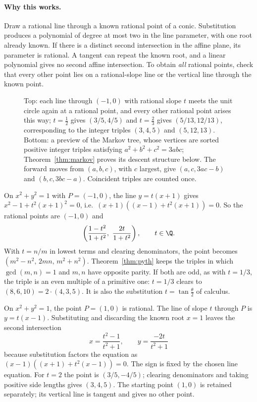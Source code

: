 \paragraph{Why this works.}
Draw a rational line through a known rational point of a conic. Substitution produces a polynomial of degree at most two in the line parameter, with one root already known. If there is a distinct second intersection in the affine plane, its parameter is rational. A tangent can repeat the known root, and a linear polynomial gives no second affine intersection. To obtain \emph{all} rational points, check that every other point lies on a rational-slope line or the vertical line through the known point.

\begin{figure}[ht]
\centering
{}
\caption{Top: each line through $(-1,0)$ with rational slope $t$ meets the unit circle again at a rational point, and every other rational point arises this way; $t=\frac12$ gives $(3/5,4/5)$ and $t=\frac23$ gives $(5/13,12/13)$, corresponding to the integer triples $(3,4,5)$ and $(5,12,13)$. Bottom: a preview of the Markov tree, whose vertices are sorted positive integer triples satisfying $a^2+b^2+c^2=3abc$; Theorem~\ref{thm:markov} proves its descent structure below. The forward moves from $(a,b,c)$, with $c$ largest, give $(a,c,3ac-b)$ and $(b,c,3bc-a)$. Coincident triples are counted once.}
\label{fig:chordmarkov}
\end{figure}

\begin{example}
On $x^2+y^2=1$ with $P=(-1,0)$, the line $y=t(x+1)$ gives $x^2-1+t^2(x+1)^2=0$, i.e.\ $(x+1)\left((x-1)+t^2(x+1)\right)=0$. So the rational points are $(-1,0)$ and
\[
\left(\frac{1-t^2}{1+t^2},\ \frac{2t}{1+t^2}\right),\qquad t\in\Q.
\]
With $t=n/m$ in lowest terms and clearing denominators, the point becomes $(m^2-n^2,\,2mn,\,m^2+n^2)$. Theorem~\ref{thm:pyth} keeps the triples in which $\gcd(m,n)=1$ and $m,n$ have opposite parity. If both are odd, as with $t=1/3$, the triple is an even multiple of a primitive one: $t=1/3$ clears to $(8,6,10)=2\cdot(4,3,5)$. It is also the substitution $t=\tan\frac\theta2$ of calculus.
\end{example}

\begin{examplex}
On $x^2+y^2=1$, the point $P=(1,0)$ is rational. The line of slope $t$ through $P$ is $y=t(x-1)$. Substituting and discarding the known root $x=1$ leaves the second intersection
\[
x=\frac{t^2-1}{t^2+1},\qquad y=\frac{-2t}{t^2+1}
\]
because substitution factors the equation as $(x-1)((x+1)+t^2(x-1))=0$. The sign is fixed by the chosen line equation. For $t=2$ the point is $(3/5,-4/5)$; clearing denominators and taking positive side lengths gives $(3,4,5)$. The starting point $(1,0)$ is retained separately; its vertical line is tangent and gives no other point.
\end{examplex}

